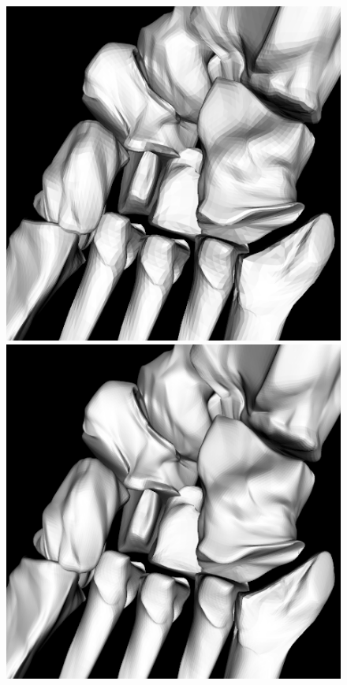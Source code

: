 \documentclass[10pt, conference, compsocconf]{IEEEtran}
\begin{document}
\begin{figure}[htbp]
{\begin{minipage}[h]{0.16\linewidth}
        \includegraphics[width=\textwidth]{./Figure/footbones/middle/butterfly2.png}\\
        \includegraphics[width=\textwidth]{./Figure/footbones/middle/butterfly3.png}\vspace{1ex}\\

\end{minipage}}
\end{figure}
\end{document}
